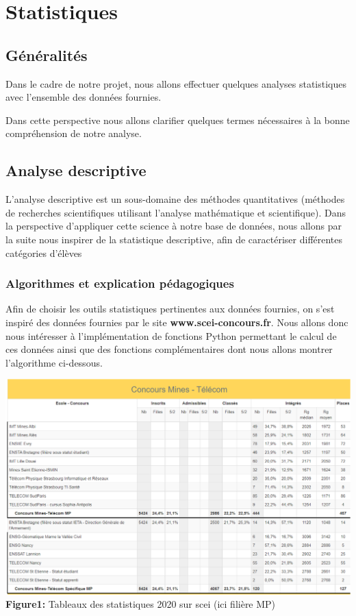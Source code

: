 \chapter{Statistiques}
   \minitoc
      \section{Généralités}

      Dans le cadre de notre projet, nous allons effectuer quelques analyses statistiques avec l'ensemble des données fournies.
      
      Dans cette perspective nous allons clarifier quelques termes nécessaires à la bonne compréhension de notre analyse.
      \section{Analyse descriptive}
        L'analyse descriptive est un sous-domaine des méthodes quantitatives (méthodes de recherches scientifiques utilisant l'analyse mathématique et scientifique). Dans la perspective d'appliquer cette science à notre base de données, nous allons par la suite nous inspirer de la statistique descriptive, afin de caractériser différentes catégories d'élèves 

         
         \subsection{Algorithmes et explication pédagogiques}
         
         Afin de choisir les outils statistiques pertinentes aux données fournies, on s'est inspiré des données fournies par le site \textbf{www.scei-concours.fr}.
         Nous allons donc nous intéresser à l'implémentation de fonctions Python permettant le calcul de ces données ainsi que des fonctions complémentaires dont nous allons montrer l'algorithme ci-dessous.
          \begin{center}
         \includegraphics[width=15cm]{statimt.png}\\
         \textbf{Figure1:} Tableaux des statistiques 2020 sur scei (ici filière MP)
         \end{center}
         
